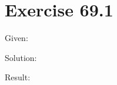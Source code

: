 \documentclass[a4paper, 10pt]{scrartcl}
\begin{document}
\section{Exercise 69.1}

Given:

Solution:

Result:
\end{document}
